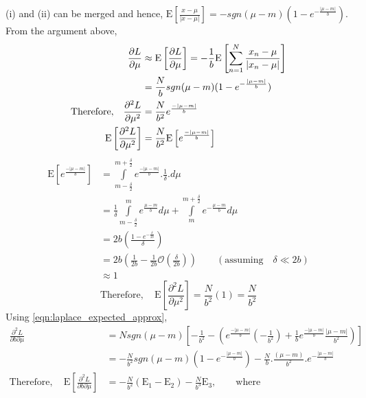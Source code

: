 \documentclass[wcp]{jmlr}
\begin{document}
(i) and (ii) can be merged and hence, $\mathrm{E}\left[\frac{x-\mu}{|x-\mu|}\right] = - sgn(\mu-m) (1 - e^{-\frac{|\mu-m|}{b}})$. From the argument above,
\begin{align}
 \frac{\partial L}{\partial \mu} &\approx \mathrm{E}\left[\frac{\partial L}{\partial \mu}\right] = -\frac{1}{b} \mathrm{E}\left[\sum_{n=1}^{N}\frac{x_n-\mu}{|x_n-\mu|}\right]\notag\\
 &= \frac{N}{b} sgn(\mu-m) (1 - e^{-\frac{|\mu-m|}{b}}) \label{eqn:laplace_expected_approx}\\
 \mathrm{Therefore,}\quad \frac{\partial^2 L}{\partial \mu^2} &= \frac{N}{b^2} e^{\frac{-|\mu-m|}{b}} \notag\\
 \mathrm{E} \left[\frac{\partial^2 L}{\partial \mu^2}\right] &= \frac{N}{b^2} \mathrm{E}\left[e^{\frac{-|\mu-m|}{b}}\right] \notag
\end{align}
\begin{align*}
 \mathrm{E}\left[e^{\frac{-|\mu-m|}{b}}\right] &= \int\limits_{m-\frac{\delta}{2}}^{m+\frac{\delta}{2}} e^{\frac{-|\mu-m|}{b}} . \frac{1}{\delta} . d\mu \\
 &= \frac{1}{\delta} \int\limits_{m-\frac{\delta}{2}}^{m} e^{\frac{\mu-m}{b}} d\mu + \int\limits_{m}^{m+\frac{\delta}{2}}e^{-\frac{\mu-m}{b}} d\mu \\
 &= 2b \left(\frac{1-e^{-\frac{\delta}{2b}}}{\delta}\right) \\
 &= 2b \left( \frac{1}{2b} - \frac{1}{2b}\mathcal{O}\left(\frac{\delta}{2b}\right) \right) \quad\quad(\mathrm{assuming} \quad \delta \ll 2b) \\
 &\approx 1
 \end{align*}
\begin{equation*}
 \mathrm{Therefore,}\quad \mathrm{E} \left[\frac{\partial^2 L}{\partial \mu^2}\right] = \frac{N}{b^2} (1) = \frac{N}{b^2}
\end{equation*}
Using \eqref{eqn:laplace_expected_approx}, 
\begin{align*}
 \frac{\partial^2 L}{\partial b \partial \mu} &= N sgn(\mu-m) \left[ -\frac{1}{b^2} - \left( e^{\frac{-|\mu-m|}{b}} \left( -\frac{1}{b^2} \right) + \frac{1}{b} e^{\frac{-|\mu-m|}{b}} \frac{|\mu-m|}{b^2} \right) \right] \\
 &= -\frac{N}{b^2} sgn(\mu-m)(1-e^{-\frac{|\mu-m|}{b}}) - \frac{N}{b} . \frac{(\mu-m)}{b^2} . e^{-\frac{|\mu-m|}{b}} \\
 \mathrm{Therefore,}\quad \mathrm{E} \left[\frac{\partial^2 L}{\partial b \partial \mu}\right] &= -\frac{N}{b^2} (\mathrm{E}_1 - \mathrm{E}_2) - \frac{N}{b^3} \mathrm{E}_3, \quad\quad\mathrm{where}
\end{align*}
\end{document}
